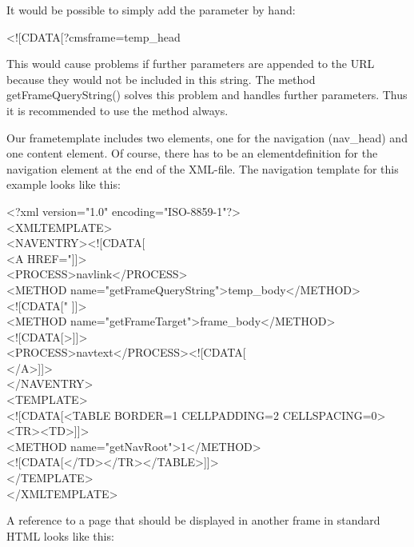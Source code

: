 It would be possible to simply add the parameter by hand:

\begin{xml}
<![CDATA[?cmsframe=temp\_head
\end{xml}

This would cause problems if further parameters are appended to the
URL because they would not be included in this string. The method {\meth
getFrameQueryString()} solves this problem and handles further
parameters. Thus it is recommended to use the method always.

Our frametemplate includes two elements, one for the navigation
(nav\_head) and one content element. Of course, there has to be an
elementdefinition for the navigation element at the end of the
XML-file.  The navigation template for this example looks like
this:

\begin{xml}
<?xml version="1.0" encoding="ISO-8859-1"?>\\
<XMLTEMPLATE>\\

<NAVENTRY><![CDATA[\\
\xtaba   <A HREF="]]>\\
\xtaba   <PROCESS>navlink</PROCESS>\\
\xtaba     <METHOD name="getFrameQueryString">temp\_body</METHOD>\\
\xtaba     <![CDATA[" ]]>\\
\xtaba     <METHOD name="getFrameTarget">frame\_body</METHOD>\\
\xtaba     <![CDATA[>]]>\\
\xtaba   <PROCESS>navtext</PROCESS><![CDATA[\\
\xtaba   </A>]]>\\
</NAVENTRY>\\

<TEMPLATE>\\
\xtaba   <![CDATA[<TABLE BORDER=1 CELLPADDING=2 CELLSPACING=0><TR><TD>]]>\\
\xtaba   <METHOD name="getNavRoot">1</METHOD>\\
\xtaba   <![CDATA[</TD></TR></TABLE>]]>\\
</TEMPLATE>\\

</XMLTEMPLATE>\\
\end{xml}

A reference to a page that should be displayed in another frame in standard HTML looks like
this:

